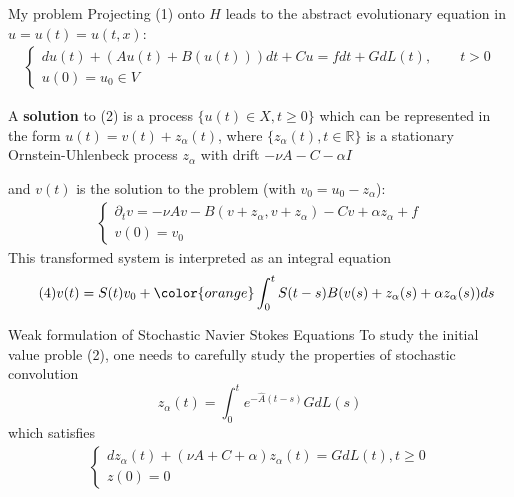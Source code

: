\documentclass[xcolor=dvipsnames,leqno]{beamer}
\newcommand{\R}{\mathbb{R}}
\begin{document}
\begin{frame}{My problem}  
Projecting (1) onto $H$ leads to the abstract evolutionary equation in $u=u(t)=u(t,x)$:
	\begin{align*}\tag{2}%
			\begin{cases}
		        du(t)+(Au(t)+B(u(t)))dt+Cu=fdt+GdL(t), \qquad t>0\\
				u(0)=u_0\in V%
			\end{cases}
	\end{align*}  

A \textbf{solution} to (2) is a process $\{u(t)\in X,t\geq 0\}$ which can be represented in the form $u(t) = v(t) +z_{\alpha}(t)$, where $\{z_{\alpha}(t), t\in\R\}$ is a stationary Ornstein-Uhlenbeck process $z_{\alpha}$ with drift $-\nu A-C-\alpha I$
	
and $v(t)$ is the solution to the problem (with $v_0 = u_0-z_{\alpha}$):
	\begin{align*}\tag{3}
		\begin{cases}
			\partial_t v = -\nu Av- B(v+z_{\alpha},v+z_{\alpha}) - Cv +\alpha z_{\alpha} +f \\
			v(0)=v_0
		\end{cases}
	\end{align*}
This transformed system is interpreted as an integral equation
\begin{align*}\tag{4}
	v(t)&=S(t)v_0+{\color{orange}\int_{0}^{t}S(t-s)B(v(s)+z_{\alpha}(s)+\alpha z_{\alpha}(s))ds}
\end{align*}
   
\end{frame} 
\begin{frame}{Weak formulation of Stochastic Navier Stokes Equations}
To study the initial value proble (2), one needs to carefully study the properties of stochastic convolution $$z_{\alpha}(t)=\int^t_0 e^{-\hat{A}(t-s)} GdL(s)$$ which satisfies
	\begin{align*}\tag{3}
		\begin{cases}
			dz_{\alpha}(t)+(\nu A + C+\alpha)z_{\alpha}(t)=GdL(t), t\geq 0\\
			z(0)=0
		\end{cases}
	\end{align*}
\end{frame}              
\end{document}
